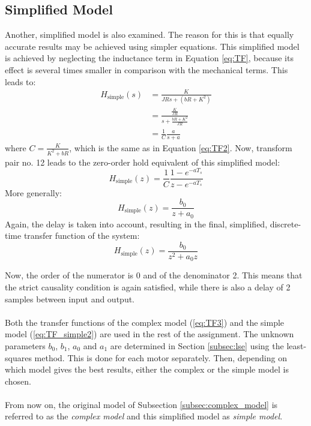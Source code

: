 \documentclass[a4paper,kul]{kulakarticle} %
\begin{document}
\subsection{Simplified Model}
Another, simplified model is also examined. The reason for this is that equally accurate results may be achieved using simpler equations. This simplified model is achieved by neglecting the inductance term in Equation \ref{eq:TF}, because its effect is several times smaller in comparison with the mechanical terms. This leads to:
\begin{equation}
\label{eq:TF_simple}
	\begin{split}
	H_{\text{simple}}(s) &= \frac{K}{JRs + (bR + K^2)} \\
	&= \frac{\frac{K}{JR}}{s + \frac{bR + K^2}{JR}} \\
	&= \frac{1}{C}\frac{a}{s + a}
	\end{split}
\end{equation}
where $C = \frac{K}{K^2 + bR}$, which is the same as in Equation \ref{eq:TF2}. Now, transform pair no. 12 leads to the zero-order hold equivalent of this simplified model:
\begin{equation}
	H_{\text{simple}}(z) = \frac{1}{C}\frac{1-e^{-aT_s}}{z-e^{-aT_s}}
\end{equation}
More generally:
\begin{equation}
	H_{\text{simple}}(z) = \frac{b_0}{z + a_0}
\end{equation}
Again, the delay is taken into account, resulting in the final, simplified, discrete-time transfer function of the system:
\begin{equation}
\label{eq:TF_simple2}
	H_{\text{simple}}(z) = \frac{b_0}{z^2 + a_0 z}
\end{equation}

\noindent Now, the order of the numerator is 0 and of the denominator 2. This means that the strict causality condition is again satisfied, while there is also a delay of 2 samples between input and output.
\\\\
Both the transfer functions of the complex model (\ref{eq:TF3}) and the simple model (\ref{eq:TF_simple2}) are used in the rest of the assignment. The unknown parameters $b_0$, $b_1$, $a_0$ and $a_1$ are determined in Section \ref{subsec:lse} using the least-squares method. This is done for each motor separately. Then, depending on which model gives the best results, either the complex or the simple model is chosen.
\\\\
From now on, the original model of Subsection \ref{subsec:complex_model} is referred to as the \textit{complex model} and this simplified model as \textit{simple model}.
\end{document}
